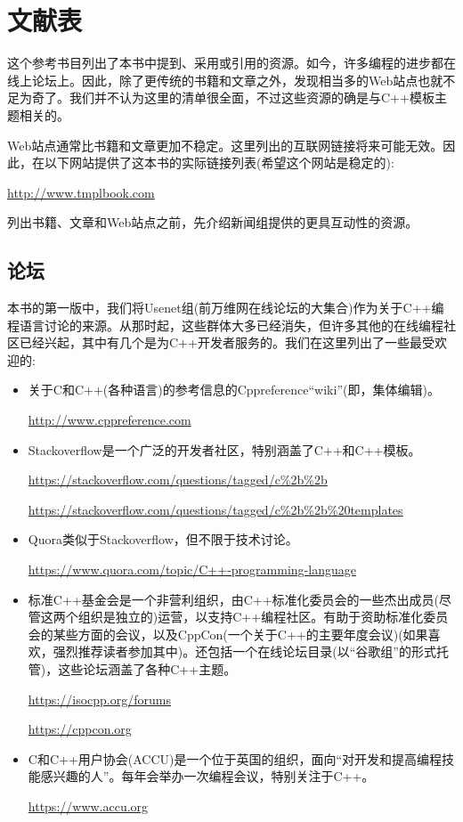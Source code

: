 \chapter*{文献表}

这个参考书目列出了本书中提到、采用或引用的资源。如今，许多编程的进步都在线上论坛上。因此，除了更传统的书籍和文章之外，发现相当多的Web站点也就不足为奇了。我们并不认为这里的清单很全面，不过这些资源的确是与C++模板主题相关的。

Web站点通常比书籍和文章更加不稳定。这里列出的互联网链接将来可能无效。因此，在以下网站提供了这本书的实际链接列表(希望这个网站是稳定的):

\url{http://www.tmplbook.com}

列出书籍、文章和Web站点之前，先介绍新闻组提供的更具互动性的资源。

\section*{论坛}

本书的第一版中，我们将Usenet组(前万维网在线论坛的大集合)作为关于C++编程语言讨论的来源。从那时起，这些群体大多已经消失，但许多其他的在线编程社区已经兴起，其中有几个是为C++开发者服务的。我们在这里列出了一些最受欢迎的:

\begin{itemize}
\item 
关于C和C++(各种语言)的参考信息的Cppreference“wiki”(即，集体编辑)。

\url{http://www.cppreference.com}

\item
Stackoverflow是一个广泛的开发者社区，特别涵盖了C++和C++模板。

\url{https://stackoverflow.com/questions/tagged/c%2b%2b}

\url{https://stackoverflow.com/questions/tagged/c%2b%2b%20templates}

\item
Quora类似于Stackoverflow，但不限于技术讨论。

\url{https://www.quora.com/topic/C++-programming-language}

\item
标准C++基金会是一个非营利组织，由C++标准化委员会的一些杰出成员(尽管这两个组织是独立的)运营，以支持C++编程社区。有助于资助标准化委员会的某些方面的会议，以及CppCon(一个关于C++的主要年度会议)(如果喜欢，强烈推荐读者参加其中)。还包括一个在线论坛目录(以“谷歌组”的形式托管)，这些论坛涵盖了各种C++主题。

\url{https://isocpp.org/forums}

\url{https://cppcon.org}

\item
C和C++用户协会(ACCU)是一个位于英国的组织，面向“对开发和提高编程技能感兴趣的人”。每年会举办一次编程会议，特别关注于C++。

\url{https://www.accu.org}
\end{itemize}

